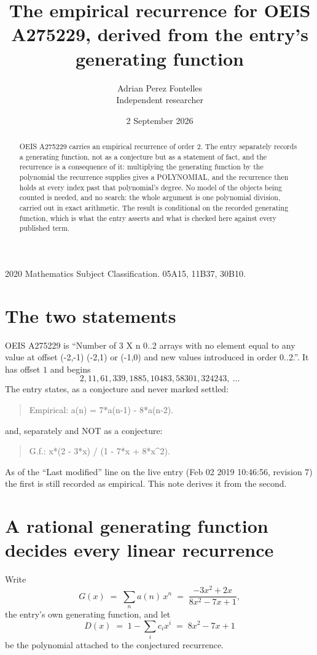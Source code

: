 \documentclass[11pt,a4paper]{article}
\title{The empirical recurrence for OEIS A275229, derived from the entry's generating function}
\author{Adrian Perez Fontelles\\ \small Independent researcher}
\date{2 September 2026}
\theoremstyle{plain}
\theoremstyle{definition}
\begin{document}
\maketitle

\begin{abstract}
OEIS A275229 carries an empirical recurrence of order $2$. The entry separately records a
generating function, not as a conjecture but as a statement of fact, and the recurrence is a
consequence of it: multiplying the generating function by the polynomial the recurrence
supplies gives a POLYNOMIAL, and the recurrence then holds at every index past that
polynomial's degree. No model of the objects being counted is needed, and no search: the
whole argument is one polynomial division, carried out in exact arithmetic. The result is
conditional on the recorded generating function, which is what the entry asserts and what is
checked here against every published term.
\end{abstract}

\noindent\small 2020 Mathematics Subject Classification. 05A15, 11B37, 30B10.\normalsize

\section{The two statements}

OEIS A275229 is ``Number of 3 X n 0..2 arrays with no element equal to any value at offset (-2,-1) (-2,1) or (-1,0) and new values introduced in order 0..2.''. It has offset $1$ and begins
\[
2, 11, 61, 339, 1885, 10483, 58301, 324243,\ \dots
\]
The entry states, as a conjecture and never marked settled:
\begin{quote}
Empirical: a(n) = 7*a(n-1) - 8*a(n-2).
\end{quote}
and, separately and NOT as a conjecture:
\begin{quote}
G.f.: x*(2 - 3*x) / (1 - 7*x + 8*x\^{}2).
\end{quote}
As of the ``Last modified'' line on the live entry (Feb 02 2019 10:46:56, revision 7) the first is still
recorded as empirical. This note derives it from the second.

\section{A rational generating function decides every linear recurrence}

Write
\[
G(x)\;=\;\sum_{n}a(n)\,x^{n}\;=\;\frac{- 3 x^{2} + 2 x}{8 x^{2} - 7 x + 1},
\]
the entry's own generating function, and let
\[
D(x)\;=\;1-\sum_i c_i x^{i}\;=\;8 x^{2} - 7 x + 1
\]
be the polynomial attached to the conjectured recurrence.
\end{document}
